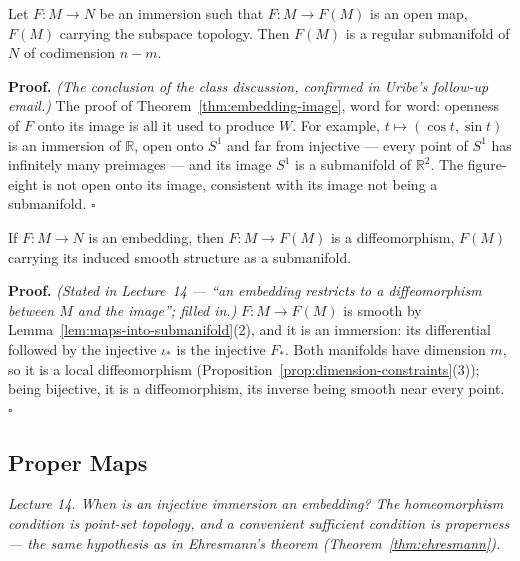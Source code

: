 \documentclass[11pt]{report}
\makeatletter
\newcounter{thmcounter}[section]
\renewenvironment{proof}[1][Proof]{\noindent\textbf{#1.} }{\hfill$\square$\par\vspace{5pt}}
\newcommand{\thmlabel}[1]{\edef\@currentlabel{\arabic{section}.\arabic{thmcounter}}\label{#1}}
\makeatother
\begin{document}
\begin{propbox}\thmlabel{prop:immersion-open-image}
Let $F : M \to N$ be an immersion such that $F : M \to F(M)$ is an open map, $F(M)$ carrying the subspace topology. Then $F(M)$ is a regular submanifold of $N$ of codimension $n - m$.
\end{propbox}

\begin{proof}
\textit{(The conclusion of the class discussion, confirmed in Uribe's follow-up email.)} The proof of Theorem~\ref{thm:embedding-image}, word for word: openness of $F$ onto its image is all it used to produce $W$. For example, $t \mapsto (\cos t, \sin t)$ is an immersion of $\mathbb{R}$, open onto $S^1$ and far from injective --- every point of $S^1$ has infinitely many preimages --- and its image $S^1$ is a submanifold of $\mathbb{R}^2$. The figure-eight is not open onto its image, consistent with its image not being a submanifold.
\end{proof}

\begin{corbox}\thmlabel{cor:embedding-diffeo}
If $F : M \to N$ is an embedding, then $F : M \to F(M)$ is a diffeomorphism, $F(M)$ carrying its induced smooth structure as a submanifold.
\end{corbox}

\begin{proof}
\textit{(Stated in Lecture~14 --- ``an embedding restricts to a diffeomorphism between $M$ and the image''; filled in.)} $F : M \to F(M)$ is smooth by Lemma~\ref{lem:maps-into-submanifold}(2), and it is an immersion: its differential followed by the injective $\iota_*$ is the injective $F_*$. Both manifolds have dimension $m$, so it is a local diffeomorphism (Proposition~\ref{prop:dimension-constraints}(3)); being bijective, it is a diffeomorphism, its inverse being smooth near every point.
\end{proof}

\subsection{Proper Maps}\label{sub:proper-maps}

\textit{Lecture 14. When is an injective immersion an embedding? The homeomorphism condition is point-set topology, and a convenient sufficient condition is properness --- the same hypothesis as in Ehresmann's theorem (Theorem~\ref{thm:ehresmann}).}
\end{document}
